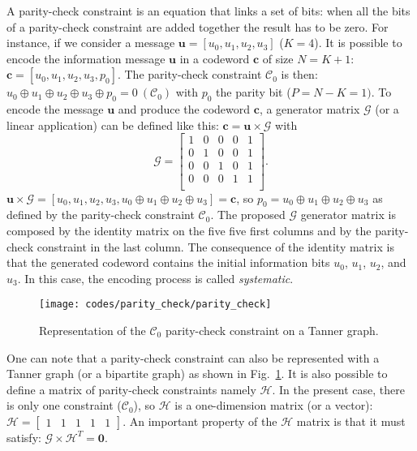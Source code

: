 A parity-check constraint is an equation that links a set of bits: when all the
bits of a parity-check constraint are added together the result has to be
zero. For instance, if we consider a message $\bm{u} = [u_0, u_1, u_2, u_3]$
($K = 4$). It is possible to encode the information message $\bm{u}$ in a
codeword $\bm{c}$ of size $N = K + 1$: $\bm{c} = [u_0,u_1,u_2,u_3,p_0]$.
The parity-check constraint $\mathcal{C}_0$ is then: $u_0 \oplus u_1 \oplus u_2
\oplus u_3 \oplus p_0 = 0~(\mathcal{C}_0)$ with $p_0$ the parity bit ($P = N -
K = 1)$. To encode the message $\bm{u}$ and produce the codeword $\bm{c}$, a
generator matrix $\bm{\mathcal{G}}$ (or a linear application) can be defined
like this: $\bm{c} = \bm{u} \times \bm{\mathcal{G}}$ with
\begin{equation*}
\bm{\mathcal{G}} =
\begin{bmatrix}
1 & 0 & 0 & 0 & 1\\
0 & 1 & 0 & 0 & 1\\
0 & 0 & 1 & 0 & 1\\
0 & 0 & 0 & 1 & 1\\
\end{bmatrix}
.
\end{equation*}
$\bm{u} \times \bm{\mathcal{G}} = [u_0,u_1,u_2,u_3,u_0 \oplus u_1 \oplus u_2
\oplus u_3] = \bm{c}$, so $p_0 = u_0 \oplus u_1 \oplus u_2 \oplus u_3$ as
defined by the parity-check constraint $\mathcal{C}_0$. The proposed
$\bm{\mathcal{G}}$ generator matrix is composed by the identity matrix on the
five five first columns and by the parity-check constraint in the last column.
The consequence of the identity matrix is that the generated codeword contains
the initial information bits $u_0$, $u_1$, $u_2$, and $u_3$. In this case, the
encoding process is called \emph{systematic}.

\begin{figure}[htp]
  \centering
  \texttt{[image: codes/parity\_check/parity\_check]}
  \caption{Representation of the $\mathcal{C}_0$ parity-check constraint on a
    Tanner graph.}
  \label{fig:ctx_codes_parity_check}
\end{figure}
One can note that a parity-check constraint can also be represented with a
Tanner graph (or a bipartite graph) as shown in
Fig.~\ref{fig:ctx_codes_parity_check}. It is also possible to define a matrix of
parity-check constraints namely $\bm{\mathcal{H}}$. In the present case, there
is only one constraint ($\mathcal{C}_0$), so $\bm{\mathcal{H}}$ is a
one-dimension matrix (or a vector):
$
\bm{\mathcal{H}} =
\begin{bmatrix}
1 & 1 & 1 & 1 & 1
\end{bmatrix}.
$
An important property of the $\bm{\mathcal{H}}$ matrix is that it must satisfy:
$\bm{\mathcal{G}} \times \bm{\mathcal{H}}^T = \bm{0}.$

